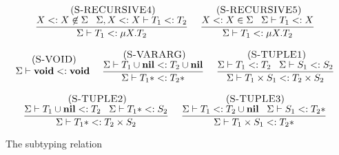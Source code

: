 \begin{figure}[!ht]
\begin{footnotesize}
$$\begin{array}{c}
\begin{array}{c}
\end{array}
\\ \\
\begin{array}{c}
\; (\textsc{S-RECURSIVE4})\\
\dfrac{X <: X \not\in \Sigma \;\;\;
       \Sigma, X <: X \vdash T_{1} <: T_{2}}
      {\Sigma \vdash T_{1} <: \mu X.T_{2}}
\end{array}
\;
\begin{array}{c}
\; (\textsc{S-RECURSIVE5})\\
\dfrac{X <: X \in \Sigma \;\;\;
       \Sigma \vdash T_{1} <: X}
      {\Sigma \vdash T_{1} <: \mu X.T_{2}}
\end{array}
\\ \\
\begin{array}{c}
\; (\textsc{S-VOID})\\
\Sigma \vdash \mathbf{void} <: \mathbf{void}
\end{array}
\;
\begin{array}{c}
\; (\textsc{S-VARARG})\\
\dfrac{\Sigma \vdash T_{1} \cup \mathbf{nil} <: T_{2} \cup \mathbf{nil}}
      {\Sigma \vdash T_{1}* <: T_{2}*}
\end{array}
\;
\begin{array}{c}
\; (\textsc{S-TUPLE1})\\
\dfrac{\Sigma \vdash T_{1} <: T_{2} \;\;\;
       \Sigma \vdash S_{1} <: S_{2}}
      {\Sigma \vdash T_{1} \times S_{1} <: T_{2} \times S_{2}}
\end{array}
\\ \\
\begin{array}{c}
\; (\textsc{S-TUPLE2})\\
\dfrac{\Sigma \vdash T_{1} \cup \mathbf{nil} <: T_{2} \;\;\;
       \Sigma \vdash T_{1}* <: S_{2}}
      {\Sigma \vdash T_{1}* <: T_{2} \times S_{2}}
\end{array}
\;
\begin{array}{c}
\; (\textsc{S-TUPLE3})\\
\dfrac{\Sigma \vdash T_{1} <: T_{2} \cup \mathbf{nil} \;\;\;
       \Sigma \vdash S_{1} <: T_{2}*}
      {\Sigma \vdash T_{1} \times S_{1} <: T_{2}*}
\end{array}
\end{array}
$$
\end{footnotesize}
\dend
\caption{The subtyping relation}
\label{fig:subtyping}
\end{figure}

